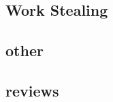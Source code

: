 \documentclass{article}
\begin{document}
\cite{CPE:CPE1631}
\cite{Bhatti2017}
\cite{5599103}
\cite{Posner2018}
\cite{CCGrid2018}
\cite{8025281}
\cite{7307597}


\subsection{Work Stealing}
\cite{Yang2017}
\cite{Chen:2015:LWS:2775085.2766450}
\cite{Blumofe:1999:SMC:324133.324234}
\cite{Cilk}
\cite{Saraswat:2011:LGL:1941553.1941582}

\subsection{other}

\cite{Gao:2017:MPL:3110224.3110240}
\cite{CAMPOS20001213}
\cite{PINAR2004974}
\cite{7551381}
\cite{Menon:2013:DDL:2503210.2503284}
\cite{Liu:2017}
\cite{SEVERIUKHINA2017139}
\cite{7965131}


\subsection{reviews}

\cite{Teresco_2partitioning}

\printbibliography
\end{document}

